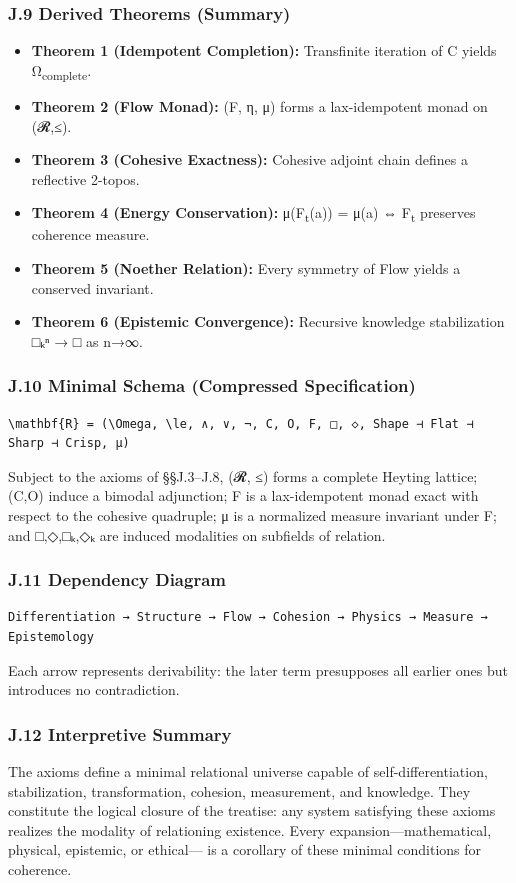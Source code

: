 \documentclass[11pt]{article}
\begin{document}
\subsubsection*{J.9 Derived Theorems (Summary)}
\label{sec:org7669f8e}
\begin{itemize}
\item \textbf{\textbf{Theorem 1 (Idempotent Completion):}} Transfinite iteration of C yields Ω\textsubscript{complete}.
\item \textbf{\textbf{Theorem 2 (Flow Monad):}} (F, η, μ) forms a lax-idempotent monad on (𝓡,≤).
\item \textbf{\textbf{Theorem 3 (Cohesive Exactness):}} Cohesive adjoint chain defines a reflective 2-topos.
\item \textbf{\textbf{Theorem 4 (Energy Conservation):}} μ(F\textsubscript{t}(a)) = μ(a) ⇔ F\textsubscript{t} preserves coherence measure.
\item \textbf{\textbf{Theorem 5 (Noether Relation):}} Every symmetry of Flow yields a conserved invariant.
\item \textbf{\textbf{Theorem 6 (Epistemic Convergence):}} Recursive knowledge stabilization □ₖⁿ → □ as n→∞.
\end{itemize}
\subsubsection*{J.10 Minimal Schema (Compressed Specification)}
\label{sec:org591b819}
\begin{verbatim}
\mathbf{R} = (\Omega, \le, ∧, ∨, ¬, C, O, F, □, ◇, Shape ⊣ Flat ⊣ Sharp ⊣ Crisp, μ)
\end{verbatim}

Subject to the axioms of §§J.3–J.8,  
(𝓡, ≤) forms a complete Heyting lattice;  
(C,O) induce a bimodal adjunction;  
F is a lax-idempotent monad exact with respect to the cohesive quadruple;  
μ is a normalized measure invariant under F;  
and □,◇,□ₖ,◇ₖ are induced modalities on subfields of relation.
\subsubsection*{J.11 Dependency Diagram}
\label{sec:org38efce3}
\begin{verbatim}
Differentiation → Structure → Flow → Cohesion → Physics → Measure → Epistemology
\end{verbatim}
Each arrow represents derivability:  
the later term presupposes all earlier ones but introduces no contradiction.
\subsubsection*{J.12 Interpretive Summary}
\label{sec:orgb13a6f5}
The axioms define a minimal relational universe capable of  
self-differentiation, stabilization, transformation, cohesion, measurement, and knowledge.  
They constitute the logical closure of the treatise:  
any system satisfying these axioms realizes the modality of relationing existence.  
Every expansion—mathematical, physical, epistemic, or ethical—  
is a corollary of these minimal conditions for coherence.
\end{document}
